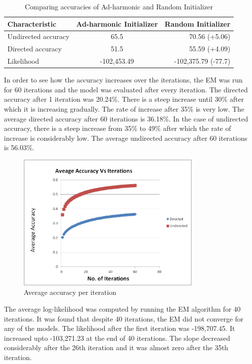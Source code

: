 \documentclass{book}
\begin{document}
\begin{table}[htbp]
\onehalfspacing
\begin{center}
\begin{tabular}{|l|c|r|}
\hline
\textbf{Characteristic} & \textbf{Ad-harmonic Initializer} & \textbf{Random Initializer}\\
\hline
Undirected accuracy &  65.5   &    70.56 (+5.06) \\
Directed accuracy &  51.5   &   55.59 (+4.09) \\
Likelihood &  -102,453.49   &  -102,375.79 (-77.7) \\
\hline
\end{tabular}
\end{center}
\caption{Comparing accuracies of Ad-harmonic and Random Initializer}
\end{table}


In order to see how the accuracy increases over the iterations, the EM was run for 60 iterations and the model was evaluated after every iteration. The directed accuracy after 1 iteration was 20.24\%. There is a steep increase until 30\% after which it is increasing gradually. The rate of increase after 35\% is very low. The average directed accuracy after 60 iterations is 36.18\%. In the case of undirected accuracy, there is a steep increase from 35\% to 49\% after which the rate of increase is considerably low. The average undirected accuracy after 60 iterations is 56.03\%.

\begin{figure}[!ht]
\centering
\includegraphics[width=90mm]{images/avg_accuracy.png}
\caption{Average accuracy per iteration}
\label{overflow}
\end{figure}

The average log-likelihood was computed by running the EM algorithm for 40 iterations. It was found that despite 40 iterations, the EM did not converge for any of the models. The likelihood after the first iteration was -198,707.45. It increased upto -103,271.23 at the end of 40 iterations. The slope decreased considerably after the 26th iteration and it was almost zero after the 35th iteration.
\end{document}
